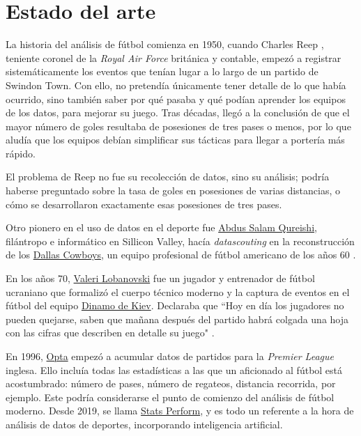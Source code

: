 \chapter{Estado del arte}
La historia del análisis de fútbol comienza en 1950, cuando Charles Reep \cite{reep-bio}, teniente coronel de 
la \textit{Royal Air Force} británica y contable, empezó a 
registrar sistemáticamente los eventos que tenían lugar a lo largo de un partido de Swindon Town. Con ello, no pretendía 
únicamente tener detalle de lo que había ocurrido, sino también saber por qué pasaba y qué podían aprender los 
equipos de los datos, para mejorar su juego. Tras décadas, llegó a la conclusión de que el mayor número 
de goles resultaba de posesiones de tres pases o menos, por lo que aludía que los equipos debían simplificar 
sus tácticas para llegar a portería más rápido.

El problema de Reep no fue su recolección de datos, sino su análisis; podría haberse preguntado sobre 
la tasa de goles en posesiones de varias distancias, o cómo se desarrollaron exactamente esas 
posesiones de tres pases. 

Otro pionero en el uso de datos en el deporte fue \href{http://www.riazhaq.com/2022/08/remembering-salam-qureishi-pillar-of.html}{Abdus Salam Qureishi}, 
filántropo e informático en Sillicon Valley, hacía \textit{datascouting} en la reconstrucción de los 
\href{https://www.dallascowboys.com/}{Dallas Cowboys}, un equipo profesional de fútbol americano de los años 60 \cite{chazan2020sports}.

En los años 70, \href{https://es.wikipedia.org/wiki/Valeri_Lobanovski}{Valeri Lobanovski} fue un jugador y entrenador de 
fútbol ucraniano que formalizó el cuerpo técnico moderno y la captura de eventos en el fútbol del equipo \href{https://es.wikipedia.org/wiki/F._C._Dinamo_de_Kiev}{Dinamo de 
Kiev}. Declaraba que ``Hoy en día los jugadores no pueden quejarse, saben que mañana después del partido habrá colgada una hoja con 
las cifras que describen en detalle su juego" \cite{kilpatrick2011inverting}.

En 1996, \href{https://es.wikipedia.org/wiki/Opta_Sports}{Opta} empezó a acumular datos de partidos para la 
\textit{Premier League} inglesa. Ello incluía todas las estadísticas a las que un aficionado al fútbol está 
acostumbrado: número de pases, número de regateos, distancia recorrida, por ejemplo. Este podría considerarse 
el punto de comienzo del análisis de fútbol moderno. Desde 2019, se llama \href{https://www.statsperform.com/}{Stats Perform}, y 
es todo un referente a la hora de análisis de datos de deportes, incorporando inteligencia artificial.

